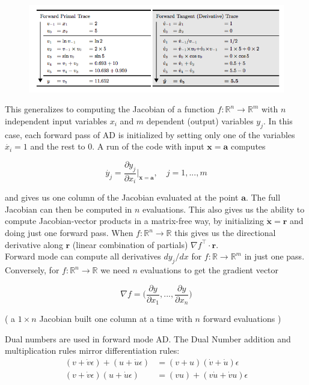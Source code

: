 \documentclass[11pt]{article}
\theoremstyle{definition}
\theoremstyle{plain}
\renewcommand{\v}[1]{\mathbf{#1}}
\renewcommand{\b}[1]{\mathbb{#1}}
\begin{document}
\begin{figure}[H]
\includegraphics[width=12cm]{forward_dual}
\centering
\end{figure}


\noindent 
This generalizes to computing the Jacobian of a function $f: \b{R}^n \rightarrow \b{R}^m$
with $n$ independent input variables $x_i$ and $m$ dependent (output) variables $y_j$.
In this case, each forward pass of AD is initialized by setting only one of the variables
$\dot{x_i}=1$ and the rest to $0$. A run of the code with input $\v{x}=\v{a}$ computes

        $$ \dot{y_j} = \frac{\partial y_j}{\partial x_i} \rvert_{\v{x}=\v{a}}, 
            \quad j=1,...,m $$

\noindent and gives us one column of the Jacobian evaluated at the point $\v{a}$. The full
Jacobian can then be computed in $n$ evaluations. 
This also gives us the ability to compute Jacobian-vector products in a matrix-free way,
by initializing $\dot{\v{x}}=\v{r}$ and doing just one forward pass. When $f:\b{R}^n \rightarrow
\b{R}$ this gives us the directional derivative along $\v{r}$ (linear combination of partials)
$\nabla f^\top \cdot \v{r}$.\\

\noindent Forward mode can compute all derivatives $d y_j / dx$ for $f: \b{R} \rightarrow \b{R}^m$ in just one pass. Conversely, for $f: \b{R}^n \rightarrow \b{R}$ we need $n$ evaluations
to get the gradient vector

$$ \nabla f = \Big( \frac{\partial y}{\partial x_1},...,\frac{\partial y}{\partial x_n} \Big )$$

\noindent( a $1 \times n$ Jacobian built one column at a time with $n$ forward evaluations )

\noindent Dual numbers are used in forward mode AD. The Dual Number addition
and multiplication rules mirror differentiation rules:
\begin{align*}
    (v + \dot{v} \epsilon) + (u + \dot{u} \epsilon) &= (v+u) (\dot{v}+\dot{u})\epsilon\\
    (v + \dot{v} \epsilon)(u + \dot{u}\epsilon) &= (vu) + (v \dot{u} + \dot{v} u )\epsilon
\end{align*}
\end{document}
